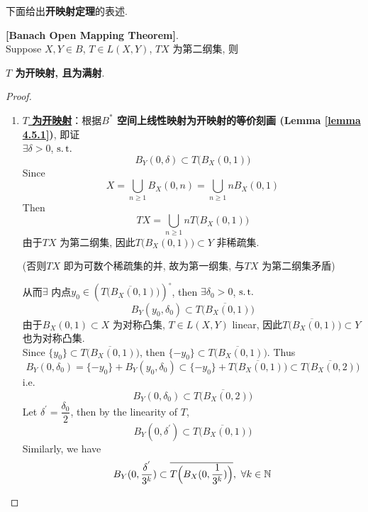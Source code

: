 	\newpage
	
	下面给出\textbf{开映射定理}的表述. 
	
	\begin{thm}\label{thm 4.5.2}
		\textbf{[Banach Open Mapping Theorem]}. \\
		Suppose $X , Y \in B$, $T \in L(X , Y)$, $TX$ 为第二纲集, 则
		\begin{center}
			\textbf{$T$ 为开映射, 且为满射}.
		\end{center} 
		
		\vspace*{4em}
		
		\begin{proof}
			\begin{enumerate}
				\item \underline{\textbf{$T$ 为开映射}}：根据\textbf{$B^*$ 空间上线性映射为开映射的等价刻画 (Lemma \ref{lemma 4.5.1})}, 即证\\
				$\exists \delta > 0$, $\operatorname{s.t.}$
				\[ B_{Y}(0 , \delta) \subset T \Big( B_X(0 , 1) \Big) \]
				Since 
				\[ X = \bigcup_{n \geq 1} B_X(0 , n) = \bigcup_{n \geq 1} n B_X(0 , 1) \]
				Then 
				\[ TX = \bigcup_{n \geq 1} n T \Big( B_X(0 , 1) \Big) \]
				由于$TX$ 为第二纲集, 因此$T \Big( B_X(0 , 1) \Big) \subset Y$ 非稀疏集.
				\begin{center}
					(否则$TX$ 即为可数个稀疏集的并, 故为第一纲集, 与$TX$ 为第二纲集矛盾) 
				\end{center}
				从而$\exists$ 内点$y_0 \in \left( \overline{T \Big( B_X(0 , 1) \Big)} \right)^{\circ}$, then $\exists \delta_0 > 0$, $\operatorname{s.t.}$
				\[ B_Y(y_0 , \delta_0) \subset \overline{T \Big( B_X(0 , 1) \Big)} \]
				由于$B_X(0 , 1) \subset X$ 为对称凸集, $T \in L(X ,Y)$ linear, 因此$\overline{T \Big( B_X(0 , 1) \Big)} \subset Y$ 也为对称凸集. \\
				Since $\{ y_0 \} \subset \overline{T \Big( B_X(0 , 1) \Big)}$, then $\{ - y_0 \} \subset \overline{T \Big( B_X(0 , 1) \Big)}$. Thus
				\[ B_Y(0 , \delta_0) = \{ - y_0 \} + B_Y(y_0 , \delta_0) \subset \{ -y_0 \} + \overline{T \Big( B_X(0 , 1) \Big)} \subset \overline{T \Big( B_X(0 , 2) \Big)} \]
				i.e.
				\[ B_Y(0 , \delta_0) \subset \overline{T \Big( B_X (0 , 2) \Big)} \]
				Let $\delta^{'} = \dfrac{\delta_0}{2}$, then by the linearity of $T$,
				\[ B_Y(0 , \delta^{'}) \subset \overline{T \Big( B_X(0 , 1) \Big)} \]
				Similarly, we have
				\[ B_Y(0 , \frac{\delta^{'}}{3^k}) \subset \overline{T \Big( B_X(0 , \frac{1}{3^k}) \Big)} , \,\, \forall k \in \mathbb{N} \]
				
				\newpage
				

\end{enumerate}
\end{proof}
\end{thm}
